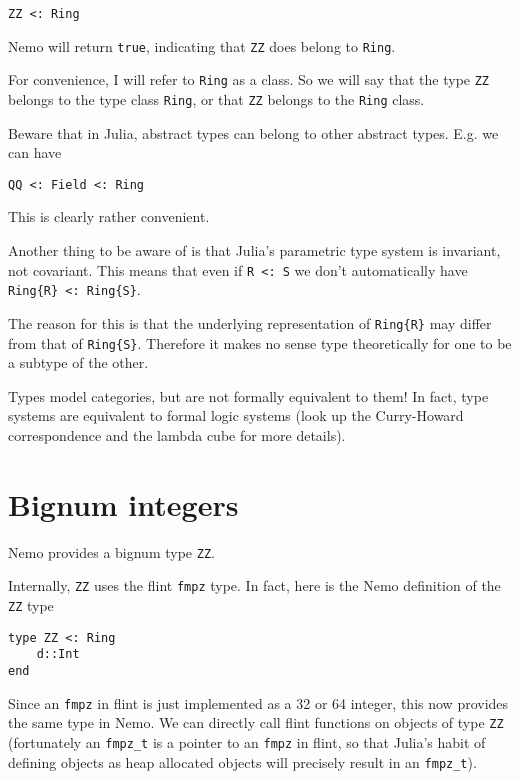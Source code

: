 \documentclass[a4paper,10pt]{article}
\newcommand{\code}{\lstinline}
\begin{document}
{{{{\begin{lstlisting}
ZZ <: Ring
\end{lstlisting}

Nemo will return \code{true}, indicating that \code{ZZ} does belong to \code{Ring}.

For convenience, I will refer to \code{Ring} as a class. So we will say that the 
type \code{ZZ} belongs to the type class \code{Ring}, or that \code{ZZ} belongs to
the \code{Ring} class.

Beware that in Julia, abstract types can belong to other abstract types. E.g. we
can have

\begin{lstlisting}
QQ <: Field <: Ring
\end{lstlisting}

This is clearly rather convenient.

Another thing to be aware of is that Julia's parametric type system is invariant,
not covariant. This means that even if \code{R <: S} we don't automatically have
\code|Ring{R} <: Ring{S}|.

The reason for this is that the underlying representation of \code|Ring{R}| may
differ from that of \code|Ring{S}|. Therefore it makes no sense type theoretically
for one to be a subtype of the other.

Types model categories, but are not formally equivalent to them! In fact, type
systems are equivalent to formal logic systems (look up the Curry-Howard
correspondence and the lambda cube for more details).

\section{Bignum integers}

Nemo provides a bignum type \code{ZZ}.

Internally, \code{ZZ} uses the flint \code{fmpz} type. In fact, here is the Nemo
definition of the \code{ZZ} type

\begin{lstlisting}
type ZZ <: Ring
    d::Int
end
\end{lstlisting}

Since an \code{fmpz} in flint is just implemented as a 32 or 64 integer, this now 
provides the same type in Nemo. We can directly call flint functions on objects of
type \code{ZZ} (fortunately an \code{fmpz_t} is a pointer to an \code{fmpz} in 
flint, so that Julia's habit of defining objects as heap allocated objects will 
precisely result in an \code{fmpz_t}).

}}}}
\end{document}
